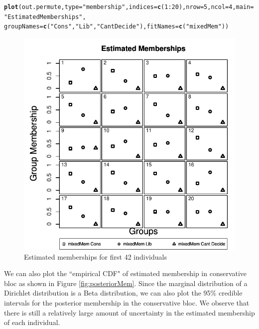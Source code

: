 \documentclass{article}\usepackage[]{graphicx}\usepackage[]{color}
\makeatletter
\def\maxwidth{ %
  \ifdim\Gin@nat@width>\linewidth
    \linewidth
  \else
    \Gin@nat@width
  \fi
}
\newcommand{\hlnum}[1]{\textcolor[rgb]{0.686,0.059,0.569}{#1}}%
\newcommand{\hlstr}[1]{\textcolor[rgb]{0.192,0.494,0.8}{#1}}%
\newcommand{\hlopt}[1]{\textcolor[rgb]{0,0,0}{#1}}%
\newcommand{\hlstd}[1]{\textcolor[rgb]{0.345,0.345,0.345}{#1}}%
\newcommand{\hlkwc}[1]{\textcolor[rgb]{0.333,0.667,0.333}{#1}}%
\newcommand{\hlkwd}[1]{\textcolor[rgb]{0.737,0.353,0.396}{\textbf{#1}}}%
\newenvironment{kframe}{%
 \def\at@end@of@kframe{}%
 \ifinner\ifhmode%
  \def\at@end@of@kframe{\end{minipage}}%
  \begin{minipage}{\columnwidth}%
 \fi\fi%
 \def\FrameCommand##1{\hskip\@totalleftmargin \hskip-\fboxsep
 \colorbox{shadecolor}{##1}\hskip-\fboxsep
     \hskip-\linewidth \hskip-\@totalleftmargin \hskip\columnwidth}%
 \MakeFramed {\advance\hsize-\width
   \@totalleftmargin\z@ \linewidth\hsize
   \@setminipage}}%
 {\par\unskip\endMakeFramed%
 \at@end@of@kframe}
\newenvironment{knitrout}{}{} %
\renewenvironment{knitrout}{\begin{singlespace}}{\end{singlespace}}
\makeatother
\begin{document}
\begin{knitrout}
\color{fgcolor}\begin{kframe}
\begin{alltt}
\hlkwd{plot}\hlstd{(out.permute,} \hlkwc{type} \hlstd{=} \hlstr{"membership"}\hlstd{,} \hlkwc{indices} \hlstd{=} \hlkwd{c}\hlstd{(}\hlnum{1}\hlopt{:}\hlnum{20}\hlstd{),} \hlkwc{nrow} \hlstd{=} \hlnum{5}\hlstd{,} \hlkwc{ncol} \hlstd{=} \hlnum{4}\hlstd{,} \hlkwc{main} \hlstd{=} \hlstr{"Estimated Memberships"}\hlstd{,}
     \hlkwc{groupNames} \hlstd{=} \hlkwd{c}\hlstd{(}\hlstr{"Cons"}\hlstd{,} \hlstr{"Lib"}\hlstd{,} \hlstr{"Cant Decide"}\hlstd{),} \hlkwc{fitNames} \hlstd{=} \hlkwd{c}\hlstd{(}\hlstr{"mixedMem"}\hlstd{))}
\end{alltt}
\end{kframe}\begin{figure}

{\centering \includegraphics[width=\maxwidth]{figure/mems-1} 

}

\caption[Estimated memberships for first 42 individuals]{Estimated memberships for first 42 individuals\label{fig:mems}}
\end{figure}


\end{knitrout}
We can also plot the ``empirical CDF" of estimated membership in conservative bloc as shown in Figure \ref{fig:posteriorMem}. Since the marginal distribution of a Dirichlet distribution is a Beta distribution, we can also plot the 95\% credible intervals for the posterior membership in the conservative bloc. We observe that there is still a relatively large amount of uncertainty in the estimated membership of each individual.
\end{document}
